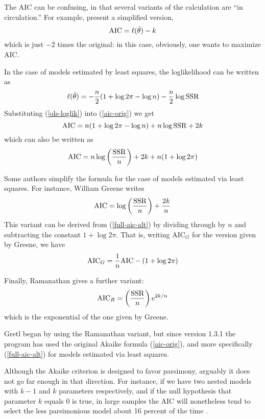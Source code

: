 The AIC can be confusing, in that several variants of the calculation
are ``in circulation.''  For example, \cite{davidson-mackinnon04}
present a simplified version,
%
\[
{\rm AIC} = \ell(\hat{\theta}) - k
\]
%
which is just $-2$ times the original: in this case, obviously, one
wants to maximize AIC.

In the case of models estimated by least squares, the loglikelihood
can be written as
%
\begin{equation}
\label{ols-loglik}
\ell(\hat{\theta}) = -\frac{n}{2}(1 + \log 2\pi - \log n)
 - \frac{n}{2} \log {\rm SSR}
\end{equation}
%
Substituting (\ref{ols-loglik}) into (\ref{aic-orig}) we get
%
\[
{\rm AIC} = n(1 + \log 2\pi - \log n) + n\log {\rm SSR} + 2k
\]
%
which can also be written as
%
\begin{equation}
\label{full-aic-alt}
{\rm AIC} = n\log \left( \frac{\rm SSR}{n} \right) + 2k + 
  n(1 + \log 2\pi)
\end{equation}
%

Some authors simplify the formula for the case of models estimated
via least squares.  For instance, William Greene writes
%
\begin{equation}
\label{aic-greene}
{\rm AIC} = \log \left( \frac{\rm SSR}{n} \right) + \frac{2k}{n}
\end{equation}
%
This variant can be derived from (\ref{full-aic-alt}) by dividing
through by $n$ and subtracting the constant $1 + \log 2\pi$.  That is,
writing AIC$_G$ for the version given by Greene, we have
%
\[
{\rm AIC}_G = \frac{1}{n} {\rm AIC} - (1 + \log 2\pi)
\]
%

Finally, Ramanathan gives a further variant:
%
\[
{\rm AIC}_R = \left( \frac{\rm SSR}{n} \right) e^{2k/n}
\]
%
which is the exponential of the one given by Greene.  

Gretl began by using the Ramanathan variant, but since version 1.3.1
the program has used the original Akaike formula (\ref{aic-orig}), and
more specifically (\ref{full-aic-alt}) for models estimated via least
squares.

\vspace{1ex}

Although the Akaike criterion is designed to favor parsimony, arguably
it does not go far enough in that direction.  For instance, if we have
two nested models with $k-1$ and $k$ parameters respectively, and if
the null hypothesis that parameter $k$ equals 0 is true, in large
samples the AIC will nonetheless tend to select the less parsimonious
model about 16 percent of the time \citep[see][chapter
15]{davidson-mackinnon04}.

